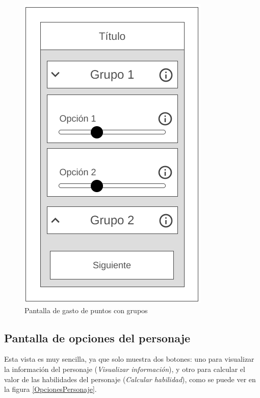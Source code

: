 \begin{figure}[H]
    \centering
    \includegraphics[scale=0.4]{Figures/Mockups/Mock_GastoPuntosGrupo.png}
    \caption{Pantalla de gasto de puntos con grupos}
    \label{GastoPuntosGrupos}    
\end{figure}
\newpage
\subsection{Pantalla de opciones del personaje}
Esta vista es muy sencilla, ya que solo muestra dos botones: uno para visualizar la información del personaje 
(\textit{Visualizar información}), y otro para calcular el valor de las habilidades del personaje (\textit{Calcular habilidad}), 
como se puede ver en la figura \ref*{OpcionesPersonaje}.

